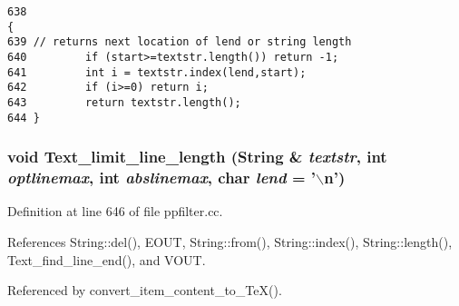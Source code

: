 \footnotesize\begin{verbatim}638                                                                       {
639 // returns next location of lend or string length
640         if (start>=textstr.length()) return -1;
641         int i = textstr.index(lend,start);
642         if (i>=0) return i;
643         return textstr.length();
644 }
\end{verbatim}\normalsize 
{}
\subsubsection{\setlength{\rightskip}{0pt plus 5cm}void Text\_\-limit\_\-line\_\-length ({\bf String} \& {\em textstr}, int {\em optlinemax}, int {\em abslinemax}, char {\em lend} = '$\backslash$n')}\label{dil2al_8hh_a356}




Definition at line 646 of file ppfilter.cc.

References String::del(), EOUT, String::from(), String::index(), String::length(), Text\_\-find\_\-line\_\-end(), and VOUT.

Referenced by convert\_\-item\_\-content\_\-to\_\-Te\-X().



